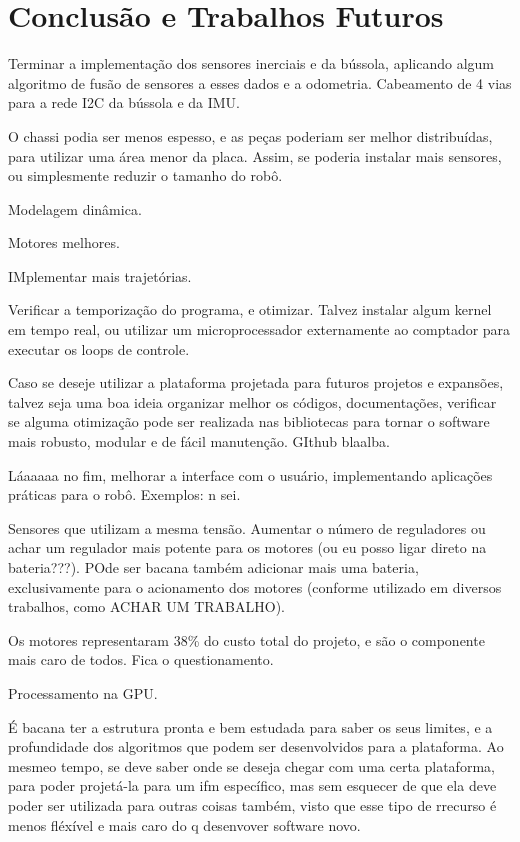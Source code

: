 \section{Conclusão e Trabalhos Futuros}
\label{sec:conclusao}

Terminar a implementação dos sensores inerciais e da bússola, aplicando algum algoritmo de fusão de sensores a esses dados e a odometria. Cabeamento de 4 vias para a rede I2C da bússola e da IMU.

O chassi podia ser menos espesso, e as peças poderiam ser melhor distribuídas, para utilizar uma área menor da placa. Assim, se poderia instalar mais sensores, ou simplesmente reduzir o tamanho do robô.

Modelagem dinâmica.

Motores melhores.

IMplementar mais trajetórias.

Verificar a temporização do programa, e otimizar. Talvez instalar algum kernel em tempo real, ou utilizar um microprocessador externamente ao comptador para executar os loops de controle.

Caso se deseje utilizar a plataforma projetada para futuros projetos e expansões, talvez seja uma boa ideia organizar melhor os códigos, documentações, verificar se alguma otimização pode ser realizada nas bibliotecas para tornar o software mais robusto, modular e de fácil manutenção. GIthub blaalba.

Láaaaaa no fim, melhorar a interface com o usuário, implementando aplicações práticas para o robô. Exemplos: n sei.

Sensores que utilizam a mesma tensão. Aumentar o número de reguladores ou achar um regulador mais potente para os motores (ou eu posso ligar direto na bateria???). POde ser bacana também adicionar mais uma bateria, exclusivamente para o acionamento dos motores (conforme utilizado em diversos trabalhos, como ACHAR UM TRABALHO).

Os motores representaram 38\% do custo total do projeto, e são o componente mais caro de todos. Fica o questionamento.

Processamento na GPU.



É bacana ter a estrutura pronta e bem estudada para saber os seus limites, e a profundidade dos algoritmos que podem ser desenvolvidos para a plataforma. Ao mesmeo tempo, se deve saber onde se deseja chegar com uma certa plataforma, para poder projetá-la para um ifm específico, mas sem esquecer de que ela deve poder ser utilizada para outras coisas também, visto que esse tipo de rrecurso é menos fléxível e mais caro do q desenvover software novo.



